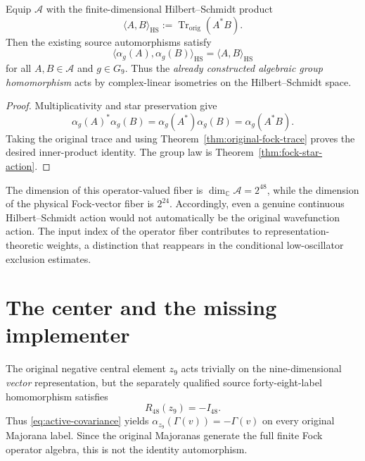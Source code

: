 \begin{proposition}
\label{prop:hs-isometry}
Equip $\mathscr A$ with the finite-dimensional Hilbert--Schmidt product
\begin{equation}\label{eq:hilbert-schmidt}
 \langle A,B\rangle_{\mathrm{HS}}
   :=\operatorname{Tr}_{\mathrm{orig}}(A^*B).
\end{equation}
Then the existing source automorphisms satisfy
\[
 \langle\alpha_g(A),\alpha_g(B)\rangle_{\mathrm{HS}}
   =\langle A,B\rangle_{\mathrm{HS}}
\]
for all $A,B\in\mathscr A$ and $g\in G_9$. Thus the \emph{already
constructed algebraic group homomorphism} acts by complex-linear
isometries on the Hilbert--Schmidt space.
\end{proposition}
\begin{proof}
Multiplicativity and star preservation give
\[
 \alpha_g(A)^*\alpha_g(B)
  =\alpha_g(A^*)\alpha_g(B)=\alpha_g(A^*B).
\]
Taking the original trace and using
Theorem~\ref{thm:original-fock-trace} proves the desired inner-product
identity. The group law is Theorem~\ref{thm:fock-star-action}.
\end{proof}

The dimension of this operator-valued fiber is
$\dim_{\mathbb C}\mathscr A=2^{48}$, while the dimension of the physical
Fock-vector fiber is $2^{24}$. Accordingly, even a genuine continuous
Hilbert--Schmidt action would not automatically be the original
wavefunction action. The input index of the operator fiber contributes
to representation-theoretic weights, a distinction that reappears in
the conditional low-oscillator exclusion estimates.

\section{The center and the missing implementer}
The original negative central element $z_9$ acts trivially on the
nine-dimensional \emph{vector} representation, but the separately
qualified source forty-eight-label homomorphism satisfies
\begin{equation}\label{eq:negative-center-48}
 R_{48}(z_9)=-I_{48}.
\end{equation}
Thus \eqref{eq:active-covariance} yields
$\alpha_{z_9}(\Gamma(v))=-\Gamma(v)$ on every original Majorana
label. Since the original Majoranas generate the full finite Fock
operator algebra, this is not the identity automorphism.

